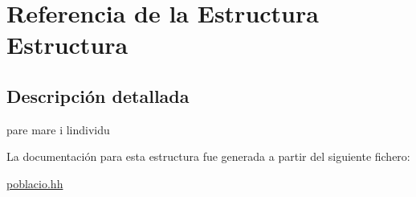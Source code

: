 \hypertarget{struct_estructura}{}\section{Referencia de la Estructura Estructura}
\label{struct_estructura}


\subsection{Descripción detallada}
pare mare i l\textquotesingle{}individu 

La documentación para esta estructura fue generada a partir del siguiente fichero\+:\begin{DoxyCompactItemize}
\item 
\hyperlink{poblacio_8hh}{poblacio.\+hh}\end{DoxyCompactItemize}
